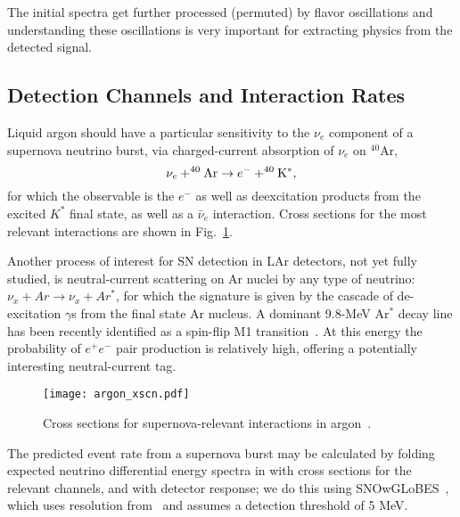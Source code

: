 The initial spectra get further processed (permuted) by flavor oscillations and understanding these oscillations is very important for extracting physics from the detected signal.


\subsection{Detection Channels and Interaction Rates}

Liquid argon should have a particular sensitivity to the $\nu_e$
component of a supernova neutrino burst, via charged-current
absorption of $\nu_e$ on $^{40}$Ar,
\begin{equation}
\nu_e + ^{40}{\rm Ar} \rightarrow e^- + ^{40}{\rm K^*},
\label{eq:nueabs}
\end{equation}
for which the observable is the $e^-$ as well as deexcitation products from the excited $K^*$ final state, as well as a $\bar{\nu}_e$ interaction.
  Cross sections for the most
relevant interactions are shown in Fig.~\ref{fig:xscns}.

Another process of interest for SN detection in LAr detectors, not yet fully studied,  is neutral-current  scattering on Ar nuclei by any type of neutrino: $\nu_x + Ar \rightarrow \nu_x + Ar^*$,  for which the signature is given by the cascade of de-excitation $\gamma$s from the final state Ar nucleus. A dominant 9.8-MeV Ar$^*$ decay line has been recently identified as a spin-flip M1 transition~\cite{Hayes}.   At this energy the probability of $e^+e^-$ pair production is relatively high, offering a potentially interesting neutral-current tag.


\begin{figure}[!htb]
\centering
\texttt{[image: argon\_xscn.pdf]}
\caption[]{Cross sections for supernova-relevant interactions in argon~\cite{GilBotella:2003sz,snowglobes}.}
\label{fig:xscns}
\end{figure}
%
The predicted event rate from a supernova burst may be calculated by
folding expected neutrino differential energy spectra in with cross
sections for the relevant channels, and with detector response; we do this using SNOwGLoBES~\cite{snowglobes}, which uses resolution from~\cite{Amoruso:2003sw} and assumes a detection threshold of 5 MeV.
%


